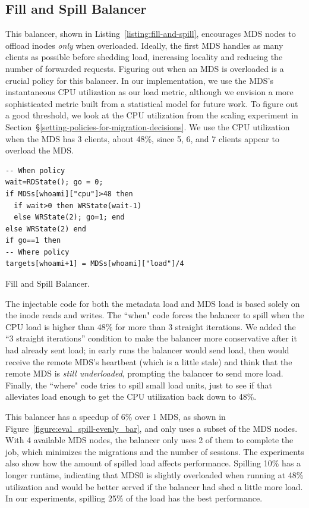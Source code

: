 \subsection{Fill and Spill Balancer}					%
\label{fill-and-spill-balancer}							%
This balancer, shown in Listing~\ref{listing:fill-and-spill}, encourages MDS nodes to offload inodes {\it only} when overloaded.  Ideally, the first MDS handles as many clients as possible before shedding load, increasing locality and reducing the number of forwarded requests. Figuring out when an MDS is overloaded is a crucial policy for this balancer. In our implementation, we use the MDS's instantaneous CPU utilization as our load metric, although we envision a more sophisticated metric built from a statistical model for future work. To figure out a good threshold, we look at the CPU utilization from the scaling experiment in Section~\S\ref{setting-policies-for-migration-decisions}. We use the CPU utilization when the MDS has 3 clients, about 48\%, since 5, 6, and 7 clients appear to overload the MDS.  

\begin{listing}
	\ssp
	\begin{verbatim}
-- When policy
wait=RDState(); go = 0;
if MDSs[whoami]["cpu"]>48 then
  if wait>0 then WRState(wait-1)
  else WRState(2); go=1; end
else WRState(2) end
if go==1 then
-- Where policy
targets[whoami+1] = MDSs[whoami]["load"]/4
	\end{verbatim}
	\dsp
    \caption{Fill and Spill Balancer.\label{listing:fill-and-spill}}
\end{listing}
The injectable code for both the metadata load and MDS load is based solely on the inode reads and writes. The ``when" code forces the balancer to spill when the CPU load is higher than 48\% for more than 3 straight iterations. We added the ``3 straight iterations'' condition to make the balancer more conservative after it had already sent load; in early runs the balancer would send load, then would receive the remote MDS's heartbeat (which is a little stale) and think that the remote MDS is {\it still underloaded}, prompting the balancer to send more load. Finally, the ``where" code tries to spill small load units, just to see if that alleviates load enough to get the CPU utilization back down to 48\%. 

This balancer has a speedup of 6\% over 1 MDS, as shown in Figure~\ref{figure:eval_spill-evenly_bar}, and only uses a subset of the MDS nodes. With 4 available MDS nodes, the balancer only uses 2 of them to complete the job, which minimizes the migrations and the number of sessions. The experiments also show how the amount of spilled load affects performance. Spilling 10\% has a longer runtime, indicating that MDS0 is slightly overloaded when running at 48\% utilization and would be better served if the balancer had shed a little more load. In our experiments, spilling 25\% of the load has the best performance.\\

